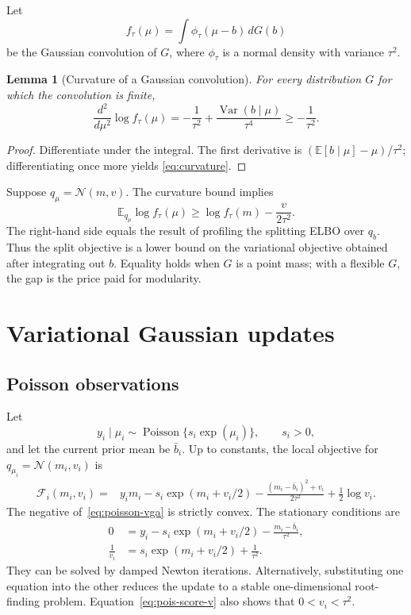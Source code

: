 \documentclass[11pt]{article}
\newtheorem{lemma}[theorem]{Lemma}
\newcommand{\E}{\mathbb{E}}
\newcommand{\V}{\operatorname{Var}}
\newcommand{\N}{\mathcal{N}}
\newcommand{\Pois}{\operatorname{Poisson}}
\begin{document}
Let
\[
 f_\tau(\mu)=\int \phi_\tau(\mu-b)\,dG(b)
\]
be the Gaussian convolution of $G$, where $\phi_\tau$ is a normal density with
variance $\tau^2$.

\begin{lemma}[Curvature of a Gaussian convolution]
For every distribution $G$ for which the convolution is finite,
\begin{equation}
 \frac{d^2}{d\mu^2}\log f_\tau(\mu)
 =-\frac{1}{\tau^2}
  +\frac{\V(b\mid\mu)}{\tau^4}
 \geq -\frac{1}{\tau^2}.
 \label{eq:curvature}
\end{equation}
\end{lemma}

\begin{proof}
Differentiate under the integral. The first derivative is
$(\E[b\mid\mu]-\mu)/\tau^2$; differentiating once more yields
\eqref{eq:curvature}.
\end{proof}

Suppose $q_\mu=\N(m,v)$. The curvature bound implies
\begin{equation}
 \E_{q_\mu}\log f_\tau(\mu)
 \geq \log f_\tau(m)-\frac{v}{2\tau^2}.
 \label{eq:collapsed-bound}
\end{equation}
The right-hand side equals the result of profiling the splitting ELBO over
$q_b$. Thus the split objective is a lower bound on the variational objective
obtained after integrating out $b$. Equality holds when $G$ is a point mass;
with a flexible $G$, the gap is the price paid for modularity.

\section{Variational Gaussian updates}

\subsection{Poisson observations}

Let
\[
 y_i\mid\mu_i\sim\Pois\{s_i\exp(\mu_i)\},
 \qquad s_i>0,
\]
and let the current prior mean be $\bar b_i$. Up to constants, the local
objective for $q_{\mu_i}=\N(m_i,v_i)$ is
\begin{align}
 \mathcal{F}_i(m_i,v_i)
  ={}&y_i m_i-s_i\exp(m_i+v_i/2)
  -\frac{(m_i-\bar b_i)^2+v_i}{2\tau^2}
  +\frac{1}{2}\log v_i.
 \label{eq:poisson-vga}
\end{align}
The negative of~\eqref{eq:poisson-vga} is strictly convex. The stationary
conditions are
\begin{align}
 0&=y_i-s_i\exp(m_i+v_i/2)-\frac{m_i-\bar b_i}{\tau^2},
 \label{eq:pois-score-m}\\
 \frac{1}{v_i}&=s_i\exp(m_i+v_i/2)+\frac{1}{\tau^2}.
 \label{eq:pois-score-v}
\end{align}
They can be solved by damped Newton iterations. Alternatively, substituting
one equation into the other reduces the update to a stable one-dimensional
root-finding problem. Equation~\eqref{eq:pois-score-v} also shows that
$0<v_i<\tau^2$.
\end{document}
